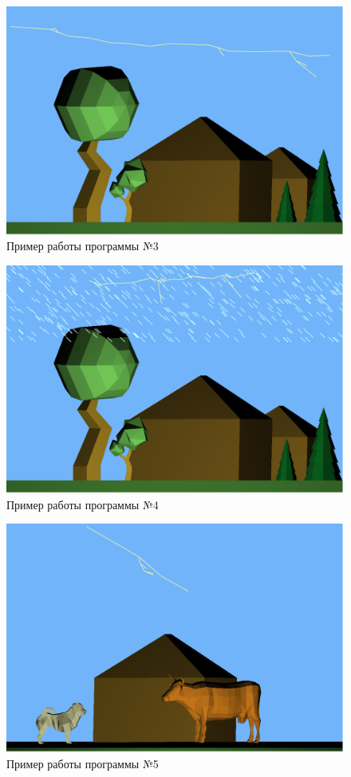 \begin{figure}[H]
	\centering
	\includegraphics[scale=0.2]{include/3.png}
	\caption{Пример работы программы №3}
	\label{img:3}
\end{figure} 

\begin{figure}[H]
	\centering
	\includegraphics[scale=0.2]{include/4.png}
	\caption{Пример работы программы №4}
	\label{img:4}
\end{figure} 

\begin{figure}[H]
	\centering
	\includegraphics[scale=0.2]{include/5.png}
	\caption{Пример работы программы №5}
	\label{img:5}
\end{figure} 

